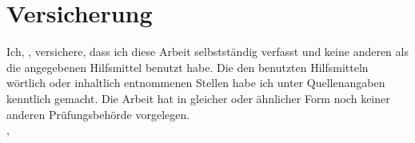
\section*{Versicherung}
Ich, \NameStudent{}, versichere, dass ich diese Arbeit selbstständig verfasst und keine anderen als die angegebenen Hilfsmittel benutzt habe.
Die den benutzten Hilfsmitteln wörtlich oder inhaltlich entnommenen Stellen habe ich unter Quellenangaben kenntlich gemacht.
Die Arbeit hat in gleicher oder ähnlicher Form noch keiner anderen Prüfungsbehörde vorgelegen.\\[1cm]

\noindent
\OrtStudent{}, \DatumEinreichung{}